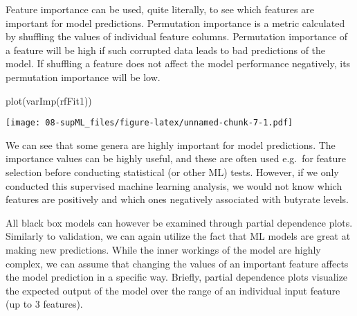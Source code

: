 \documentclass[
  oneside]{book}
\newenvironment{Shaded}{\begin{snugshade}}{\end{snugshade}}
\newcommand{\FunctionTok}[1]{\textcolor[rgb]{0.00,0.00,0.00}{#1}}
\newcommand{\NormalTok}[1]{#1}
\begin{document}
Feature importance can be used, quite literally, to see which features are important
for model predictions. Permutation importance is a metric calculated by shuffling the
values of individual feature columns. Permutation importance of a feature will be high
if such corrupted data leads to bad predictions of the model. If shuffling a feature
does not affect the model performance negatively, its permutation importance will be low.

\begin{Shaded}
\begin{Highlighting}[]
\FunctionTok{plot}\NormalTok{(}\FunctionTok{varImp}\NormalTok{(rfFit1))}
\end{Highlighting}
\end{Shaded}

\texttt{[image: 08-supML\_files/figure-latex/unnamed-chunk-7-1.pdf]}

We can see that some genera are highly important for model predictions. The importance
values can be highly useful, and these are often used e.g.~for feature selection before
conducting statistical (or other ML) tests. However, if we only conducted this supervised
machine learning analysis, we would not know which features are positively and which
ones negatively associated with butyrate levels.

All black box models can however be examined through partial dependence plots. Similarly to
validation, we can again utilize the fact that ML models are great at making new predictions.
While the inner workings of the model are highly complex, we can assume that changing
the values of an important feature affects the model prediction in a specific way.
Briefly, partial dependence plots visualize the expected output of the model over the
range of an individual input feature (up to 3 features).
\end{document}
